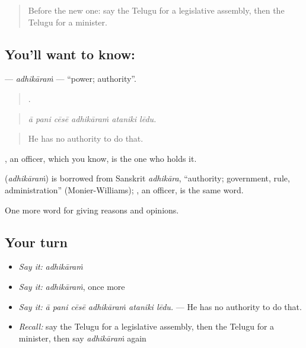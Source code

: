 \label{lesson:TE-C402-adhikaram}



\begin{quote}
Before the new one: say the Telugu for a legislative assembly, then the Telugu for a minister.
\end{quote}

\subsection*{You'll want to know: }
\textbf{} — \emph{adhikāraṁ} — \textquotedblleft{}power; authority\textquotedblright{}.

\begin{quote}
     .
\end{quote}

\begin{quote}
\emph{ā pani cēsē adhikāraṁ ataniki lēdu.}
\end{quote}

\begin{quote}
He has no authority to do that.
\end{quote}

, an officer, which you know, is the one who holds it.

\begin{cousinweb}
\textbf{} (\emph{adhikāraṁ}) is borrowed from Sanskrit \emph{adhikāra}, \textquotedblleft{}authority; government, rule, administration\textquotedblright{} (Monier-Williams); , an officer, is the same word.
\end{cousinweb}

\begin{grammarlens}[title={What you've built}]
One more word for giving reasons and opinions.
\end{grammarlens}

\subsection*{Your turn}
\begin{itemize}
\raggedright
  \item \emph{Say it:} \emph{adhikāraṁ}
  \item \emph{Say it:} \emph{adhikāraṁ}, once more
  \item \emph{Say it:} \emph{ā pani cēsē adhikāraṁ ataniki lēdu.} — He has no authority to do that.
  \item \emph{Recall:} say the Telugu for a legislative assembly, then the Telugu for a minister, then say \emph{adhikāraṁ} again
\end{itemize}

